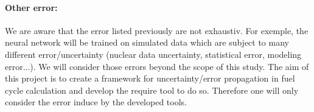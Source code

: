 \documentclass[dvips,12pt]{article}
\newcommand{\comment}[1]
{{\bfseries \color{red} #1}}
\begin{document}
\paragraph{Other error:\\}
We are aware that the error listed previously are
not exhaustiv. For exemple, the neural network
will be trained on simulated data which are
subject to many different error/uncertainty
(nuclear data uncertainty, statistical error,
modeling error...). We will consider those errors
beyond the scope of this study.
The aim of this project is to create a framework
for uncertainty/error propagation in fuel cycle
calculation and develop the require tool to do so.
Therefore one will only consider the error induce
by the developed tools.










\end{document}
